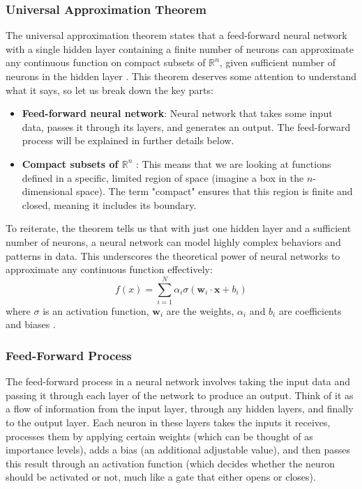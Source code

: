 \documentclass[english,11pt,a4paper,titlepage]{article}
\begin{document}
	\subsubsection*{Universal Approximation Theorem}
	The universal approximation theorem states that a feed-forward neural network with a single hidden layer containing a finite number of neurons can approximate any continuous function on compact subsets of \(\mathbb{R}^n\), given sufficient number of neurons in the hidden layer \cite{hornikMultilayerFeedforwardNetworks1989}. This theorem deserves some attention to understand what it says, so let us break down the key parts:
	\begin{itemize}
		\item \textbf{Feed-forward neural network}: Neural network that takes some input data, passes it through its layers, and generates an output. The feed-forward process will be explained in further details below.
		\item \textbf{Compact subsets of \( \mathbb{R}^n \) }: This means that we are looking at functions defined in a specific, limited region of space (imagine a box in the \(n\)-dimensional space). The term "compact" ensures that this region is finite and closed, meaning it includes its boundary.
	\end{itemize}
	To reiterate, the theorem tells us that with just one hidden layer and a sufficient number of neurons, a neural network can model highly complex behaviors and patterns in data. This underscores the theoretical power of neural networks to approximate any continuous function effectively:
	\begin{equation*}
		f(x) = \sum_{i=1}^{N} \alpha_i \sigma(\mathbf{w}_i \cdot \mathbf{x} + b_i)
	\end{equation*}
	where \( \sigma \) is an activation function, \( \mathbf{w}_i \) are the weights, \( \alpha_i \) and \( b_i \) are coefficients and biases \cite{hornikMultilayerFeedforwardNetworks1989}.
	
	\subsubsection*{Feed-Forward Process}
	The feed-forward process in a neural network involves taking the input data and passing it through each layer of the network to produce an output. Think of it as a flow of information from the input layer, through any hidden layers, and finally to the output layer. Each neuron in these layers takes the inputs it receives, processes them by applying certain weights (which can be thought of as importance levels), adds a bias (an additional adjustable value), and then passes this result through an activation function (which decides whether the neuron should be activated or not, much like a gate that either opens or closes).
	
\end{document}
